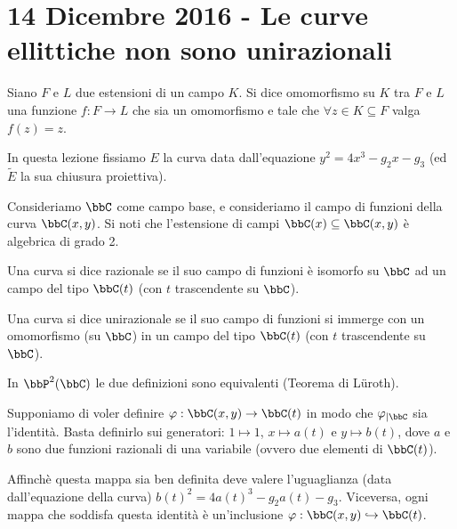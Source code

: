 \chapter{14 Dicembre 2016 - Le curve ellittiche non sono unirazionali}
\begin{definizione}
Siano $F$ e $L$ due estensioni di un campo $K$. Si dice omomorfismo su $K$ tra $F$ e $L$ una funzione $f:F\rightarrow L$ che sia un omomorfismo e tale che $\forall z\in K\subseteq F$ valga $f(z)=z$.
\end{definizione}
In questa lezione fissiamo $E$ la curva data dall'equazione $y^2=4x^3-g_2x-g_3$ (ed $\widetilde{E}$ la sua chiusura proiettiva).

Consideriamo $\bbC$ come campo base, e consideriamo il campo di funzioni della curva $\bbC(x,y)$. Si noti che l'estensione di campi $\bbC(x)\subseteq\bbC(x,y)$ è algebrica di grado 2.

\begin{definizione}
Una curva si dice razionale se il suo campo di funzioni è isomorfo su $\bbC$ ad un campo del tipo $\bbC(t)$ (con $t$ trascendente su $\bbC$).
\end{definizione}
\begin{definizione}
Una curva si dice unirazionale se il suo campo di funzioni si immerge con un omomorfismo (su $\bbC$) in un campo del tipo $\bbC(t)$ (con $t$ trascendente su $\bbC$).
\end{definizione}
\begin{osservazione}
In $\bbP^2(\bbC)$ le due definizioni sono equivalenti (Teorema di Lüroth).
\end{osservazione}
Supponiamo di voler definire $\varphi: \bbC(x,y) \rightarrow \bbC(t)$ in modo che $\varphi_{|\bbC}$ sia l'identità. Basta definirlo sui generatori: $1\mapsto 1$, $x\mapsto a(t)$ e $y\mapsto b(t)$, dove $a$ e $b$ sono due funzioni razionali di una variabile (ovvero due elementi di $\bbC(t)$).

Affinchè questa mappa sia ben definita deve valere l'uguaglianza (data dall'equazione della curva)   $b(t)^2=4a(t)^3-g_2a(t)-g_3$.
Viceversa, ogni mappa che soddisfa questa identità è un'inclusione $\varphi: \bbC(x,y) \hookrightarrow \bbC(t)$.

